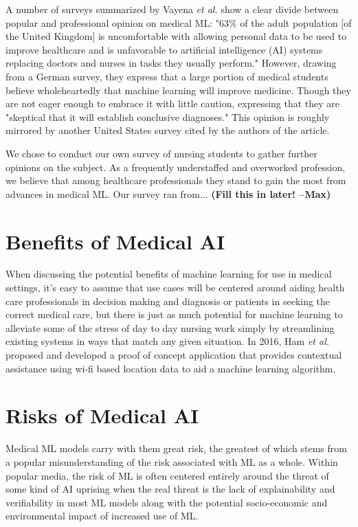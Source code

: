 \documentclass[]{article}
\begin{document}
		A number of surveys summarized by Vayena \emph{et al.} show a clear divide between popular and professional opinion on medical ML: "63\% of the adult population [of the United Kingdom] is uncomfortable with allowing personal data to be used to improve healthcare and is unfavorable to artificial intelligence (AI) systems replacing doctors and nurses in tasks they usually perform." However, drawing from a German survey, they express that a large portion of medical students believe wholeheartedly that machine learning will improve medicine. Though they are not eager enough to embrace it with little caution, expressing that they are "skeptical that it will establish conclusive diagnoses." This opinion is roughly mirrored by another United States survey cited by the authors of the article.\cite{Vayena2018}

		We chose to conduct our own survey of nursing students to gather further opinions on the subject. As a frequently understaffed and overworked profession\cite{doi:10.1111/j.1365-2648.2009.05082.x}, we believe that among healthcare professionals they stand to gain the most from advances in medical ML. Our survey ran from... \textbf{(Fill this in later! --Max)}

	\section{Benefits of Medical AI}

		When discussing the potential benefits of machine learning for use in medical settings, it's easy to assume that use cases will be centered around aiding health care professionals in decision making and diagnosis or patients in seeking the correct medical care, but there is just as much potential for machine learning to alleviate some of the stress of day to day nursing work simply by streamlining existing systems in ways that match any given situation. In 2016, Ham \emph{et al.} proposed and developed a proof of concept application that provides contextual assistance using wi-fi based location data to aid a machine learning algorithm.\cite{Ham2017}

	\section{Risks of Medical AI}
		Medical ML models carry with them great risk, the greatest of which stems from a popular misunderstanding of the risk associated with ML as a whole. Within popular media, the risk of ML is often centered entirely around the threat of some kind of AI uprising when the real threat is the lack of explainability and verifiability in most ML models along with the potential socio-economic and environmental impact of increased use of ML.\cite{bbc2016rroai,emerj2019roawrtiwwa}
\end{document}
